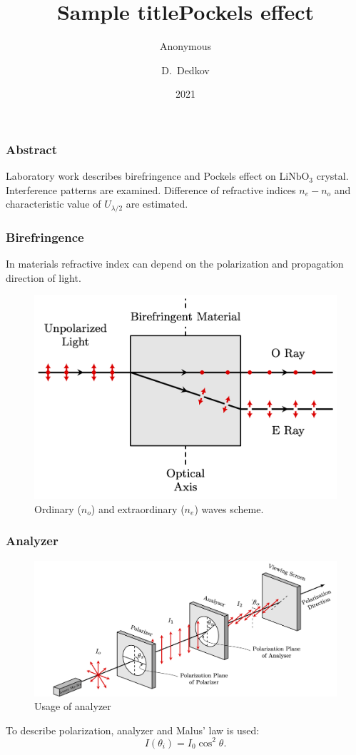 \documentclass{beamer}
\title{Sample title}
\author{Anonymous}
\institute{Overleaf}
\date{2021}
\title[About Beamer] %
{Pockels effect}
\author[Arthur, Doe] %
{D.~Dedkov }
\institute[VFU] %
{
	Moscow Institute of Physics and Technology
}
\date[VLC 2023] %
\begin{document}
	
\frame{\titlepage}

\begin{frame}
	\frametitle{Abstract}
	
	Laboratory work describes birefringence and Pockels effect on $\text{LiNbO}_3$ crystal. Interference patterns are examined. Difference of refractive indices $n_e - n_o$ and characteristic value of $U_{\lambda/2}$ are estimated.
	
\end{frame}

\begin{frame}
	\frametitle{Birefringence}
	\footnotesize
	In materials refractive index can depend on the polarization and propagation direction of light.
	\begin{figure}
		\footnotesize
		\centering
		\includegraphics[width=0.8\linewidth]{res/birefringence}
		\vspace{-5pt}
		\footnotesize
		\caption{\footnotesize Ordinary ($n_o$) and extraordinary ($n_e$) waves scheme.}
	\end{figure}		
\end{frame}

\begin{frame}
	\frametitle{Analyzer}

	\begin{figure}
		\centering
		\includegraphics[width=1\linewidth]{res/polarizer_analyzer}
		\caption{Usage of analyzer}
	\end{figure}

	To describe polarization, analyzer and Malus' law is used:
	$$
	I(\theta_i) = I_0 \cos^2{\theta}.
	\label{eq:malus}
	$$
\end{frame}
\end{document}
